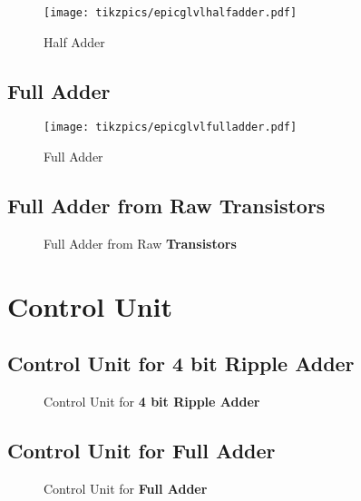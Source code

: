 \documentclass[a4paper, 10pt]{article}
\begin{document}
\begin{figure}[!ht]
	\centering
    \texttt{[image: tikzpics/epicglvlhalfadder.pdf]}
	\caption{Half Adder}
\end{figure}

\vspace{0.2\textheight}

\subsection{Full Adder}

\begin{figure}[!hb]
	\centering
    \texttt{[image: tikzpics/epicglvlfulladder.pdf]}
	\caption{Full Adder}
\end{figure}

\clearpage

\subsection{Full Adder from Raw \textbf{Transistors}}

\begin{figure}[!h]
	\centering
	\caption{Full Adder from Raw \textbf{Transistors}}
\end{figure}

\clearpage

\section{Control Unit}

\subsection{Control Unit for 4 bit Ripple Adder}

\begin{figure}[!h]
    \centering
    \caption{Control Unit for \textbf{4 bit Ripple Adder}}
\end{figure}


\clearpage

\subsection{Control Unit for Full Adder}

\begin{figure}[!h]
	\centering
	\caption{Control Unit for \textbf{Full Adder}}
\end{figure}
\end{document}
